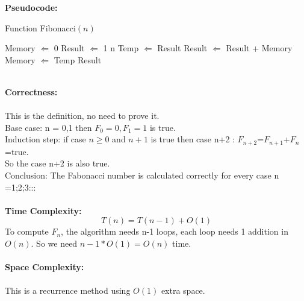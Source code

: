 \documentclass{article}
\begin{document}
\subsubsection{}
\textbf{\large Pseudocode:}
\begin{algorithm}
  \caption{Function Fibonacci$(n)$}
  \label{alg1}
  \begin{algorithmic}
  \STATE Memory $\Longleftarrow$ 0
  \STATE Result $\Longleftarrow$ 1
  \RETURN n
  \ENDIF 
  \STATE Temp $\Longleftarrow$ Result
  \STATE Result $\Longleftarrow$ Result + Memory
  \STATE Memory $\Longleftarrow$ Temp
  \ENDFOR
  \RETURN Result
  \end{algorithmic}
\end{algorithm}\\
\textbf{\large Correctness:}\\\\
This is the definition, no need to prove it.\\
Base case: n = 0,1 then $F_0=0,F_1=1$ is true.\\
Induction step: if case $n \ge 0$ and $n+1$ is true then case n+2 : $F_{n+2}$=$F_{n+1}$+$F_{n}$=true.\\
So the case n+2 is also true.\\ 
Conclusion: The Fabonacci number is calculated correctly for every case n =1;2;3:::\\\\
\textbf{\large Time Complexity:}\\
$$T(n)=T(n-1)+O(1)$$
To compute $F_n$, the algorithm needs n-1 loops, each loop needs 1 addition in $O(n)$. So we need $n-1*O(1)= O(n)$ time.\\\\
\textbf{\large Space Complexity:}\\\\
This is a recurrence method using $O(1)$ extra space.
\end{document}
